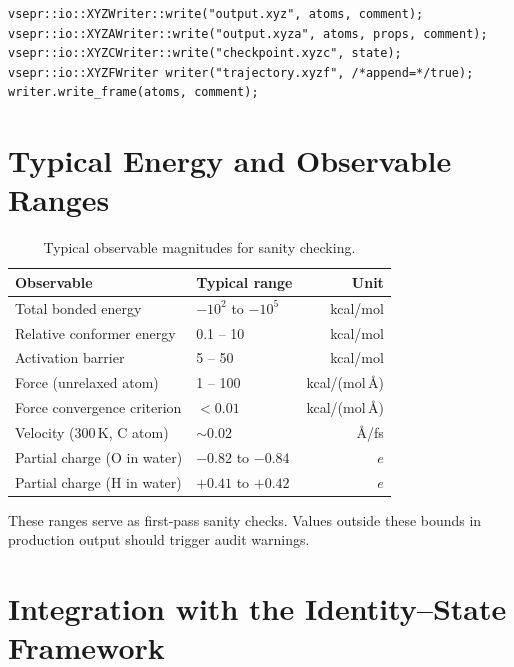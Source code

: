 \documentclass[12pt, a4paper, oneside]{article}
\begin{document}
\begin{lstlisting}
vsepr::io::XYZWriter::write("output.xyz", atoms, comment);
vsepr::io::XYZAWriter::write("output.xyza", atoms, props, comment);
vsepr::io::XYZCWriter::write("checkpoint.xyzc", state);
vsepr::io::XYZFWriter writer("trajectory.xyzf", /*append=*/true);
writer.write_frame(atoms, comment);
\end{lstlisting}

\section{Typical Energy and Observable Ranges}
\label{sec:ranges}

\begin{table}[htbp]
  \centering
  \caption{Typical observable magnitudes for sanity checking.}
  \label{tab:ranges}
  \begin{tabular}{llr}
    \toprule
    Observable & Typical range & Unit \\
    \midrule
    Total bonded energy          & $-10^2$ to $-10^5$   & kcal/mol \\
    Relative conformer energy    & 0.1 -- 10            & kcal/mol \\
    Activation barrier           & 5 -- 50              & kcal/mol \\
    Force (unrelaxed atom)       & 1 -- 100             & kcal/(mol\,\AA) \\
    Force convergence criterion  & $< 0.01$             & kcal/(mol\,\AA) \\
    Velocity (300\,K, C atom)    & $\sim 0.02$          & \AA/fs \\
    Partial charge (O in water)  & $-0.82$ to $-0.84$   & $e$ \\
    Partial charge (H in water)  & $+0.41$ to $+0.42$   & $e$ \\
    \bottomrule
  \end{tabular}
\end{table}

These ranges serve as first-pass sanity checks.  Values outside these
bounds in production output should trigger audit warnings.

\section{Integration with the Identity--State Framework}
\label{sec:s0}
\end{document}
